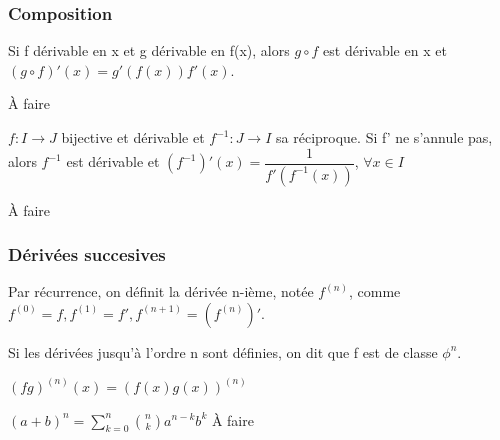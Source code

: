 \documentclass[a4paper, 12pt]{article}
\begin{document}
\subsubsection{Composition}

\begin{proposition}
    Si f dérivable en x et g dérivable en f(x), alors $g \circ f$ est dérivable en x et $(g \circ f)'(x) = g'(f(x))f'(x)$.
\end{proposition}

\begin{demonstration}
    À faire
\end{demonstration}

\begin{corollaire}
    $f: I \rightarrow J$ bijective et dérivable et $f^{-1}: J \rightarrow I$ sa réciproque.
    Si f' ne s'annule pas, alors $f^{-1}$ est dérivable et $(f^{-1})'(x) = \dfrac{1}{f'(f^{-1}(x))}$, $\forall x \in I$
\end{corollaire}

\begin{demonstration}
    À faire
\end{demonstration}

\subsubsection{Dérivées succesives}

Par récurrence, on définit la dérivée n-ième, notée $f^{(n)}$, comme
$f^{(0)} = f, f^{(1)} = f', f^{(n+1)} = (f^{(n)})'$.

Si les dérivées jusqu'à l'ordre n sont définies, on dit que f est de classe $\phi^n$.

\begin{definition}
    $(fg)^{(n)}(x) = (f(x)g(x))^{(n)}$
\end{definition}

\begin{definition}
    $(a + b)^n = \sum_{k=0}^{n}\binom{n}{k}a^{n-k}b^k$
    À faire
\end{definition}




\end{document}
